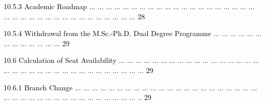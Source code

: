 \documentclass[12pt]{article}
\begin{document}
\vspace{\baselineskip}
\begin{adjustwidth}{0.5in}{0.0in}
{\fontsize{7pt}{8.4pt}\selectfont \textcolor[HTML]{00000A}{10.5.3 Academic Roadmap $ \ldots $ $ \ldots $ $ \ldots $ $ \ldots $ $ \ldots $ $ \ldots $ $ \ldots $ $ \ldots $ $ \ldots $ $ \ldots $ $ \ldots $ $ \ldots $ $ \ldots $ $ \ldots $ $ \ldots $ $ \ldots $ $ \ldots $ $ \ldots $ $ \ldots $ $ \ldots $ $ \ldots $ $ \ldots $ $ \ldots $ $ \ldots $ $ \ldots $ $ \ldots $ $ \ldots $ $ \ldots $ $ \ldots $ $ \ldots $ $ \ldots $ $ \ldots $ $ \ldots $ $ \ldots $ $ \ldots $ $ \ldots $  28}\par}\par

\end{adjustwidth}


\vspace{\baselineskip}
\begin{adjustwidth}{0.5in}{0.0in}
{\fontsize{7pt}{8.4pt}\selectfont \textcolor[HTML]{00000A}{10.5.4 Withdrawal from the M.Sc.-Ph.D. Dual Degree Programme $ \ldots $ $ \ldots $ $ \ldots $ $ \ldots $ $ \ldots $ $ \ldots $ $ \ldots $ $ \ldots $ $ \ldots $ $ \ldots $ $ \ldots $ $ \ldots $ $ \ldots $  29}\par}\par

\end{adjustwidth}


\vspace{\baselineskip}
\begin{adjustwidth}{0.21in}{0.0in}
{\fontsize{7pt}{8.4pt}\selectfont \textcolor[HTML]{00000A}{10.6 Calculation of Seat Availability $ \ldots $ $ \ldots $ $ \ldots $ $ \ldots $ $ \ldots $ $ \ldots $ $ \ldots $ $ \ldots $ $ \ldots $ $ \ldots $ $ \ldots $ $ \ldots $ $ \ldots $ $ \ldots $ $ \ldots $ $ \ldots $ $ \ldots $ $ \ldots $ $ \ldots $ $ \ldots $ $ \ldots $ $ \ldots $ $ \ldots $ $ \ldots $ $ \ldots $ $ \ldots $ $ \ldots $ $ \ldots $ $ \ldots $ $ \ldots $ $ \ldots $ $ \ldots $ $ \ldots $ ... 29}\par}\par

\end{adjustwidth}


\vspace{\baselineskip}
\begin{adjustwidth}{0.5in}{0.0in}
{\fontsize{7pt}{8.4pt}\selectfont \textcolor[HTML]{00000A}{10.6.1 Branch Change $ \ldots $ $ \ldots $ $ \ldots $ $ \ldots $ $ \ldots $ $ \ldots $ $ \ldots $ $ \ldots $ $ \ldots $ $ \ldots $ $ \ldots $ $ \ldots $ $ \ldots $ $ \ldots $ $ \ldots $ $ \ldots $ $ \ldots $ $ \ldots $ $ \ldots $ $ \ldots $ $ \ldots $ $ \ldots $ $ \ldots $ $ \ldots $ $ \ldots $ $ \ldots $ $ \ldots $ $ \ldots $ $ \ldots $ $ \ldots $ $ \ldots $ $ \ldots $ $ \ldots $ $ \ldots $ $ \ldots $ $ \ldots $ $ \ldots $ $ \ldots $ .. 29}\par}\par

\end{adjustwidth}
\end{document}
